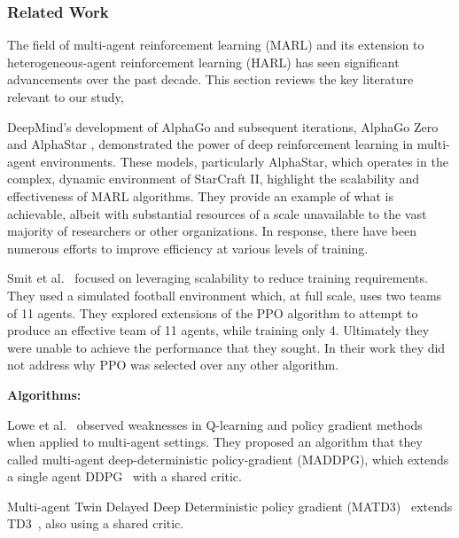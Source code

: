 \subsubsection*{Related Work}

The field of multi-agent reinforcement learning (MARL) and its extension 
to heterogeneous-agent reinforcement learning (HARL) has seen significant 
advancements over the past decade. 
This section reviews the key literature relevant to our study,

DeepMind's development of AlphaGo \cite{silver2016} and subsequent iterations, 
AlphaGo Zero \cite{silver2017} and AlphaStar \cite{vinyals2019}, demonstrated 
the power of deep reinforcement learning in multi-agent environments. 
These models, particularly AlphaStar, which operates in the complex, 
dynamic environment of StarCraft II, highlight the scalability and 
effectiveness of MARL algorithms. 
They provide an example of what is achievable, albeit with substantial 
resources of a scale unavailable to the vast majority of researchers or
other organizations.
In response, there have been numerous efforts to improve 
efficiency at various levels of training.


Smit et al.~\cite{smit2023} focused on leveraging scalability
to reduce training requirements. They used a simulated football 
environment which, at full scale, uses two teams of 11 agents.
They explored extensions of the PPO algorithm to attempt to 
produce an effective team of 11 agents, while training only 4.
Ultimately they were unable to achieve the performance that they sought.
In their work they did not address why PPO was selected over any other
algorithm.

\textbf{Algorithms:}

Lowe et al.~\cite{lowe2020} observed weaknesses in Q-learning and policy
gradient methods when applied to multi-agent settings. They proposed
an algorithm that they called multi-agent deep-deterministic policy-gradient
(MADDPG), which extends a single agent DDPG~\cite{lillicrap2019}
with a shared critic.

Multi-agent Twin Delayed Deep Deterministic policy gradient (MATD3)~
\cite{ackermann2019} extends TD3~\cite{fujimoto2018}, also using a 
shared critic.

